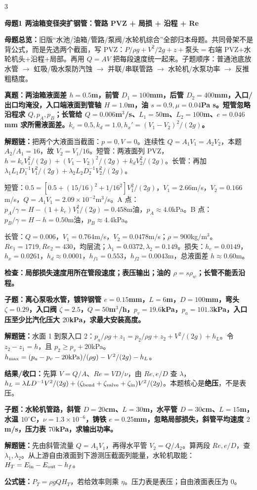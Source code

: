 \documentclass[a4paper]{article}
\newcommand{\mt}[1]{\vspace{0.22pt}\colorbox{M}{\parbox{\dimexpr\linewidth-2\fboxsep}{\color{white}\bfseries #1}}\par}
\newcommand{\qt}[1]{\vspace{0.10pt}\colorbox{Q}{\parbox{\dimexpr\linewidth-2\fboxsep}{\color{white}\bfseries #1}}\par}
\newcommand{\ans}[1]{\colorbox{G}{\parbox{\dimexpr\linewidth-2\fboxsep}{#1}}\par}
\newcommand{\warn}[1]{\colorbox{Y}{\parbox{\dimexpr\linewidth-2\fboxsep}{\color{E}\bfseries #1}}\par}
\newcommand{\chain}[1]{{\color{A}\bfseries 解题链：}#1\par}
\newcommand{\res}[1]{{\color{E}\bfseries 结果/收口：}#1\par}
\newcommand{\form}[1]{{\color{M}\bfseries 公式链：}#1\par}
\newcommand{\mview}[1]{\ans{\textbf{母题总览：}#1}}
\begin{document}
\begin{multicols}{3}
\mt{母题1 两油箱变径突扩钢管：管路 PVZ + 局损 + 沿程 + Re}
\mview{旧版“水池/油箱/管路/泵阀/水轮机综合”全部归本母题。共同骨架不是背公式，而是先选两个截面，写 PVZ：$P/\rho g+V^2/2g+z+$泵头$=$右端 PVZ$+$水轮机头$+$沿程$+$局部。再用 $Q=AV$ 把每段速度统一起来。子题顺序：普通池底放水管 $\to$ 虹吸/吸水泵防汽蚀 $\to$ 并联/串联管路 $\to$ 水轮机/水泵功率 $\to$ 反推粗糙度。}
\qt{真题：两油箱液面差 $h=0.5$m，前管 $D_1=100$mm，后管 $D_2=400$mm，入口/出口均淹没，入口端液面到管轴 $H=1.0$m，油 $s=0.9,\mu=0.04$Pa s。短管忽略沿程求 $Q,p_A,p_B$；长管给 $Q=0.006$m$^3$/s、$L_1=50$m、$L_2=100$m、$e=0.046$mm 求所需液面差。$k_e=0.5,k_d=1.0,h_x'=(V_1-V_2)^2/(2g)$。}
\chain{把两个大液面当截面：$p=0,V=0$。连续性 $Q=A_1V_1=A_2V_2$，本题 $A_2/A_1=16$，故 $V_2=V_1/16$。短管：两液面列 PVZ，$h=k_eV_1^2/(2g)+(V_1-V_2)^2/(2g)+k_dV_2^2/(2g)$。长管：再加 $\lambda_1L_1D_1^{-1}V_1^2/(2g)+\lambda_2L_2D_2^{-1}V_2^2/(2g)$。}
\ans{短管：$0.5=[0.5+(15/16)^2+1/16^2]V_1^2/(2g)$，$V_1=2.66$m/s，$V_2=0.166$m/s，$Q=A_1V_1=2.09\times10^{-2}$m$^3$/s。A 点：$p_A/\gamma=H-(1+k_e)V_1^2/(2g)=0.458$m油，$p_A\approx4.0$kPa。B 点：$p_B/\gamma=H-h=0.50$m油，$p_B\approx4.4$kPa。}
\ans{长管：$Q=0.006$，$V_1=0.764$m/s，$V_2=0.0478$m/s；$\rho=900$kg/m$^3$。$Re_1=1719,Re_2=430$，均层流；$\lambda_1=0.0372,\lambda_2=0.149$。损失：$h_e=0.0149$，$h_x=0.0261$，$h_d\approx0.0001$，$h_{f1}=0.553$，$h_{f2}=0.0043$m，总液面差 $h\approx0.60$m。}
\warn{检查：局部损失速度用所在管段速度；表压输出；油的 $\rho=s\rho_w$；长管不能丢沿程。}

\qt{子题：离心泵吸水管，镀锌钢管 $e=0.15$mm，$L=6$m，$D=100$mm，弯头 $\zeta=0.29$，入口阀 $\zeta=2.5$，$Q=50$m$^3$/h，$p_v=19.6$kPa，$p_a=101.3$kPa，入口压至少比汽化压大 $20$kPa，求最大安装高度。}
\chain{水面 1 到泵入口 2：$p_a/\rho g+z_1=p_2/\rho g+z_2+V^2/(2g)+h_L$。令 $z_2-z_1=h$，且 $p_2\ge p_v+20$kPa。$h_{\max}=(p_a-p_v-20{\rm kPa})/(\rho g)-V^2/(2g)-h_L$。}
\res{先算 $V=Q/A$、$Re=VD/\nu$，由 $Re,e/D$ 查 $\lambda$，$h_L=\lambda LD^{-1}V^2/(2g)+(\zeta_{\rm bend}+\zeta_{\rm valve}+\zeta_{\rm in}) V^2/(2g)$。本题核心是\textbf{绝压}，不是表压。}

\qt{子题：水轮机管路，斜管 $D=20$cm、$L=30$m，水平管 $D=30$cm、$L=15$m，水温 $10^\circ$C，$\nu=1.3\times10^{-6}$，铸铁 $e=0.25$mm，忽略局部损失，斜管平均速度 $2$m/s，压力表 $70$kPa，求输出功率。}
\chain{先由斜管流量 $Q=A_1V_1$，再得水平管 $V_2=Q/A_2$。算两段 $Re,e/D$，查 $\lambda_1,\lambda_2$。从上游自由液面到下游测压截面列能量，水轮机取能：$H_T=E_{\rm in}-E_{\rm out}-h_f$。}
\form{$P_T=\rho gQH_T$，若给效率则乘 $\eta$。压力表是表压；自由液面表压为 0。}


\end{multicols}
\end{document}
